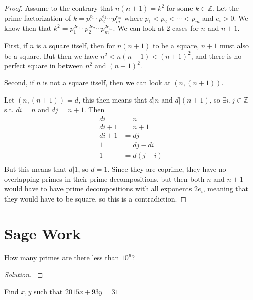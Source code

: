 \documentclass[11pt]{article}
\newcommand{\Z}{\mathbb{Z}}
\newenvironment{problem}[2][Problem]{\begin{trivlist}
\item[\hskip \labelsep {\bfseries #1}\hskip \labelsep {\bfseries #2.}]}{\end{trivlist}}
\newenvironment{solution}
  {\renewcommand\qedsymbol{$~$}\begin{proof}[Solution]$ $\par\nobreak\ignorespaces}
  {\end{proof}}
\begin{document}
\begin{proof}
  Assume to the contrary that $n(n+1)=k^2$ for some $k\in\Z$. Let the prime factorization of $k=p_1^{e_1}\cdot p_2^{e_2}\cdots p_m^{e_m}$ where $p_1<p_2<\cdots<p_m$ and $e_i>0$. We know then that $k^2 = p_1^{2e_1}\cdot p_2^{2e_2}\cdots p_m^{2e_m}$.
  We can look at 2 cases for $n$ and $n+1$.

  First, if $n$ is a square itself, then for $n(n+1)$ to be a square, $n+1$ must also be a square. But then we have $n^2<n(n+1)<(n+1)^2$, and there is no perfect square in between $n^2$ and $(n+1)^2$.

  Second, if $n$ is not a square itself, then we can look at $(n,(n+1))$.

  Let $(n,(n+1))=d$, this then means that $d|n$ and $d|(n+1)$, so $\exists i,j\in \Z$ s.t. $di=n$ and $dj=n+1$. Then
  \begin{align*}
    di     & = n      \\
    di + 1 & = n+1    \\
    di + 1 & = dj     \\
    1      & = dj-di  \\
    1      & = d(j-i) \\
  \end{align*}
  But this means that $d|1$, so $d=1$.
  Since they are coprime, they have no overlapping primes in their prime decompositions, but then both $n$ and $n+1$ would have to have prime decompositions with all exponents $2e_i$, meaning that they would have to be square, so this is a contradiction.
\end{proof}

\section{Sage Work}


\begin{problem}{A}
How many primes are there less than $10^6$?
\end{problem}

\begin{solution}
  

  
\end{solution}



\begin{problem}{B}
Find $x,y$ such that $2015x+93y=31$
\end{problem}
\end{document}
